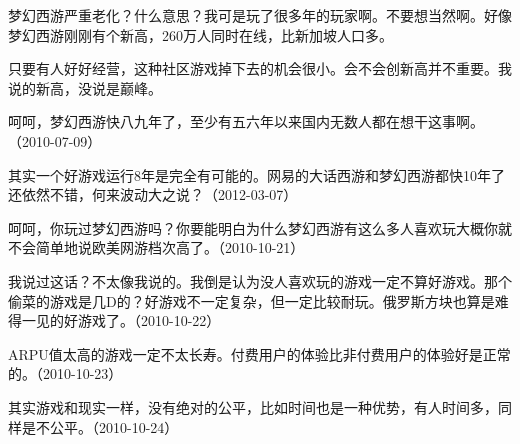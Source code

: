 
梦幻西游严重老化？什么意思？我可是玩了很多年的玩家啊。不要想当然啊。好像梦幻西游刚刚有个新高，260万人同时在线，比新加坡人口多。


只要有人好好经营，这种社区游戏掉下去的机会很小。会不会创新高并不重要。我说的新高，没说是巅峰。


呵呵，梦幻西游快八九年了，至少有五六年以来国内无数人都在想干这事啊。（2010-07-09）


其实一个好游戏运行8年是完全有可能的。网易的大话西游和梦幻西游都快10年了还依然不错，何来波动大之说？（2012-03-07）


呵呵，你玩过梦幻西游吗？你要能明白为什么梦幻西游有这么多人喜欢玩大概你就不会简单地说欧美网游档次高了。（2010-10-21）


我说过这话？不太像我说的。我倒是认为没人喜欢玩的游戏一定不算好游戏。那个偷菜的游戏是几D的？好游戏不一定复杂，但一定比较耐玩。俄罗斯方块也算是难得一见的好游戏了。（2010-10-22）


ARPU值太高的游戏一定不太长寿。付费用户的体验比非付费用户的体验好是正常的。（2010-10-23）


其实游戏和现实一样，没有绝对的公平，比如时间也是一种优势，有人时间多，同样是不公平。（2010-10-24）


